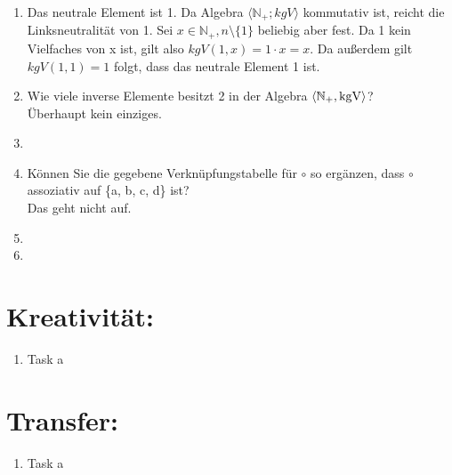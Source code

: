 \begin{enumerate}[label=(\alph*)]
        \item 
        Das neutrale Element ist 1.
        Da Algebra $\langle\mathbb{N}_+; kgV \rangle$ kommutativ ist, reicht die Linksneutralität von 1. Sei $x \in \mathbb{ N}_+, n \setminus \{1\}$ beliebig aber fest.  Da 1 kein Vielfaches von x ist, gilt also $kgV (1, x) = 1 \cdot x =  x$. Da außerdem gilt $kgV (1, 1) = 1$ folgt, dass das neutrale Element 1 ist.
        \item Wie viele inverse Elemente besitzt 2 in der Algebra $\langle \mathbb{N}_+ , \operatorname{kgV} \rangle$?\\
        Überhaupt kein einziges.
        
        \item 
        
        \item Können Sie die gegebene Verknüpfungstabelle für $\circ$ so ergänzen, dass $\circ$ assoziativ 
        auf \{a, b, c, d\} ist?\\
        Das geht nicht auf.
        
        \item
        
        \item         
        
    \end{enumerate}
    \section*{Kreativität:}
    \begin{enumerate}[label=(\alph*)]
    	\item Task a
    \end{enumerate}
    \section*{Transfer:}
    \begin{enumerate}[label=(\alph*)]
    	\item Task a
    \end{enumerate}







